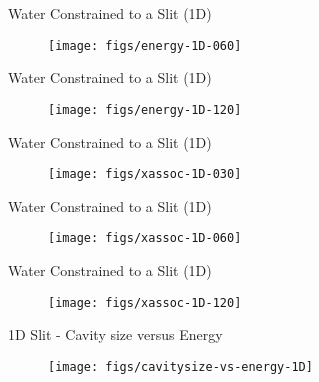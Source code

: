 \documentclass{beamer}
\begin{document}
\begin{frame}[fragile]{Water Constrained to a Slit (1D)}
\begin{figure}
\begin{center}
\texttt{[image: figs/energy-1D-060]}
\end{center}
\end{figure} 
\end{frame}

\begin{frame}[fragile]{Water Constrained to a Slit (1D)}
\begin{figure}
\begin{center}
\texttt{[image: figs/energy-1D-120]}
\end{center}
\end{figure} 
\end{frame}

\begin{frame}[fragile]{Water Constrained to a Slit (1D)}
\begin{figure}
\begin{center}
\texttt{[image: figs/xassoc-1D-030]}
\end{center}
\end{figure} 
\end{frame}

\begin{frame}[fragile]{Water Constrained to a Slit (1D)}
\begin{figure}
\begin{center}
\texttt{[image: figs/xassoc-1D-060]}
\end{center}
\end{figure} 
\end{frame}

\begin{frame}[fragile]{Water Constrained to a Slit (1D)}
\begin{figure}
\begin{center}
\texttt{[image: figs/xassoc-1D-120]}
\end{center}
\end{figure} 
\end{frame}

\begin{frame}[fragile]{1D Slit - Cavity size versus Energy}
\begin{figure}
\begin{center}
\texttt{[image: figs/cavitysize-vs-energy-1D]}
\end{center}
\end{figure} 
\end{frame}
\end{document}
